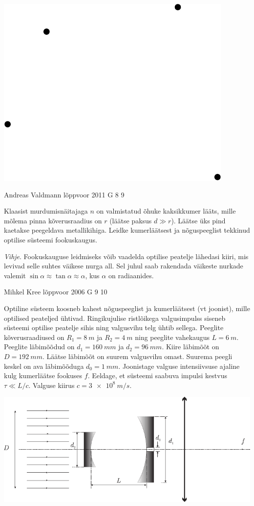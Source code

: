 \documentclass[11pt, twoside]{article}
\begin{document}
{{\begin{center}
	\includegraphics[width=0.3\linewidth]{2010-v3g-09-punktid}
\end{center}
\fi
}

{Andreas Valdmann} %
{lõppvoor} %
{2011} %
{G 8} %
{9} %
{
\ifStatement
Klaasist murdumisnäitajaga $n$ on valmistatud õhuke kaksikkumer lääts, mille mõlema pinna kõverusraadius on $r$ (läätse paksus
$d \gg r$). Läätse üks pind kaetakse peegeldava metallikihiga. Leidke kumerläätsest ja nõguspeeglist tekkinud optilise süsteemi fookuskaugus. 

\emph{Vihje}. Fookuskauguse leidmiseks võib vaadelda optilise peatelje lähedasi kiiri, mis levivad
selle suhtes väikese nurga all. Sel juhul saab rakendada väikeste nurkade valemit $\sin \alpha \approx \tan \alpha \approx \alpha$, kus $\alpha$ on radiaanides. 
\fi
}

{Mihkel Kree} %
{lõppvoor} %
{2006} %
{G 9} %
{10} %
{
\ifStatement
Optiline süsteem koosneb kahest nõguspeeglist ja kumerläätsest (vt joonist), mille optilised peateljed ühtivad. Ringikujulise ristlõikega valgusimpulss siseneb süsteemi optilise peatelje sihis ning valgusvihu telg ühtib sellega. Peeglite kõverusraadiused on $R_1 = \SI{8}{m}$ ja $R_2 = \SI{4}{m}$ ning peeglite vahekaugus $L = \SI{6}{m}$. Peeglite läbimõõdud on $d_1 = \SI{160}{mm}$ ja $d_2 = \SI{96}{mm}$. Kiire läbimõõt on $D = \SI{192}{mm}$. Läätse läbimõõt on suurem valgusvihu omast. Suurema peegli keskel on ava läbimõõduga $d_0 = \SI{1}{mm}$. Joonistage valguse intensiivsuse ajaline kulg kumerläätse fookuses $f$. Eeldage, et süsteemi saabuva impulsi kestvus $\tau \ll L/c$. Valguse kiirus $c = \SI{3e8}{m/s}$.

\begin{center}
	\includegraphics[width=0.95\linewidth]{2006-v3g-09-yl}
\end{center}
\fi
}
\newpage\subsection{\protect{}}

}
\end{document}

